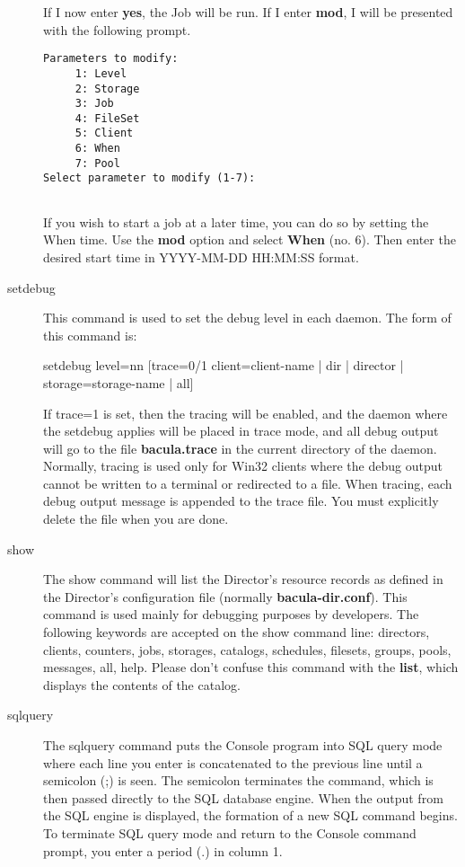 \begin{description}
If I now enter {\bf yes}, the Job will be run. If I enter {\bf mod},  I will
be presented with the following prompt.  

\footnotesize
\begin{verbatim}
Parameters to modify:
     1: Level
     2: Storage
     3: Job
     4: FileSet
     5: Client
     6: When
     7: Pool
Select parameter to modify (1-7):
     
\end{verbatim}
\normalsize

If you wish to start a job at a later time, you can do so by setting  the When
time. Use the {\bf mod} option and select {\bf When} (no. 6).  Then enter the
desired start time in YYYY-MM-DD HH:MM:SS format.  

\item [setdebug]
   This command is used to set the debug level in each  daemon. The form of this
command is:

setdebug level=nn [trace=0/1 client=\lt{}client-name\gt{} | dir | director |
storage=\lt{}storage-name\gt{} | all]  

If trace=1 is set, then the tracing will be enabled, and the  daemon where the
setdebug applies will be placed in trace mode, and  all debug output will go
to the file {\bf bacula.trace} in the  current directory of the daemon.
Normally, tracing is used only for  Win32 clients where the debug output
cannot be written to a terminal  or redirected to a file. When tracing, each
debug output message is  appended to the trace file. You must explicitly
delete the file when  you are done.  

\item [show]
   The show command will  list the Director's resource records as defined in  the
Director's configuration file (normally {\bf bacula-dir.conf}).  This command
is used mainly for debugging purposes by developers.  The following keywords
are accepted on the show command line:  directors, clients, counters, jobs,
storages, catalogs,  schedules, filesets, groups, pools, messages, all, help. 
Please don't confuse this command with the {\bf list}, which displays  the
contents of the catalog.  

\item [sqlquery]
   The sqlquery command puts the Console program  into SQL query mode where each
line you enter is concatenated  to the previous line until a semicolon (;) is
seen. The semicolon  terminates the command, which is then passed directly  to
the SQL database engine. When the output from the SQL engine  is displayed,
the formation of a new SQL command begins. To  terminate SQL query mode and
return to the Console command  prompt, you enter a period (.) in column 1.


\end{description}
